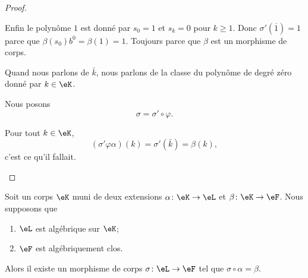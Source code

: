 \begin{proof}
\begin{subproof}
		Enfin le polynôme \( 1\) est donné par \( s_0=1\) et \( s_k=0\) pour \( k\geq 1\). Donc \( \sigma'(\overline{1})=1\) parce que \( \beta(s_0)b^0=\beta(1)=1\). Toujours parce que \( \beta\) est un morphisme de corps.

		\spitem[\( \varphi\big( \alpha(k) \big)=\bar k\)]
		Quand nous parlons de \( \bar k\), nous parlons de la classe du polynôme de degré zéro donné par \( k\in \eK\).

		\spitem[La réponse]
		Nous posons
		\begin{equation}
			\sigma=\sigma'\circ \varphi.
		\end{equation}

		Pour tout \( k\in \eK\),
		\begin{equation}
			(\sigma'\varphi\alpha)(k)=\sigma'(\bar k)=\beta(k),
		\end{equation}
		c'est ce qu'il fallait.
	\end{subproof}
\end{proof}

\begin{lemma} \label{LEMooUULTooYcytat}
	Soit un corps \( \eK\) muni de deux extensions \( \alpha\colon \eK\to \eL\) et \( \beta\colon \eK\to \eF\). Nous supposons que
	\begin{enumerate}
		\item
		      \( \eL\) est algébrique sur \( \eK\);
		\item
		      \( \eF\) est algébriquement clos.
	\end{enumerate}

	Alors il existe un morphisme de corps \( \sigma\colon \eL\to \eF\) tel que \( \sigma\circ \alpha=\beta\).
\end{lemma}

